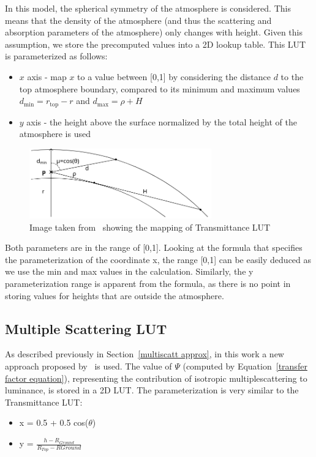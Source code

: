 \documentclass{ctuthesis}
\begin{document}
In this model, the spherical symmetry of the atmosphere is considered. This means that the density 
of the atmosphere (and thus the scattering and absorption parameters of the atmosphere) only
changes with height. Given this assumption, we store the precomputed values into a 2D lookup table.
This LUT is parameterized as follows:
\begin{itemize}
    \item $x$ axis - map $x$ to a value between [0,1] by considering the distance $d$ to the top
                     atmosphere boundary, compared to its minimum and maximum values 
                     $d_{\mathrm{min}}=r_{\mathrm{top}}-r$ and $d_{\mathrm{max}}=\rho+H$
                    \cite{bruneton_neyret_2008}
    \item $y$ axis - the height above the surface normalized by the total height of the atmosphere 
                     is used
\end{itemize}
\begin{figure}
    \centering
    \includegraphics[width=0.7\textwidth]{media/transmittance_mapping.png}
    \caption[Transmittance LUT mapping]{Image taken from~\cite{bruneton_neyret_2008} showing the mapping of Transmittance LUT}
\end{figure}

Both parameters are in the range of [0,1]. Looking at the formula that specifies the parameterization of the coordinate x,
the range [0,1] can be easily deduced as we use the min and max values in the calculation. Similarly, the y 
parameterization range is apparent from the formula, as there is no point in storing values for heights
that are outside the atmosphere.

\subsection{Multiple Scattering LUT}
As described previously in Section~\ref{multiscatt approx}, in this work a new approach proposed by~\cite{hillaire_2020} is used.
The value of $\Psi$ (computed by Equation~\ref{transfer factor equation}), representing the contribution of isotropic multiplescattering to luminance, is stored in a 2D LUT. The parameterization is very similar to the
Transmittance LUT\@:
\begin{itemize}
    \item x = 0.5 + 0.5 cos($\theta$)
    \item y = $\frac{h - R_{Ground}}{R_{Top} - R{Ground}}$
\end{itemize}
\end{document}
